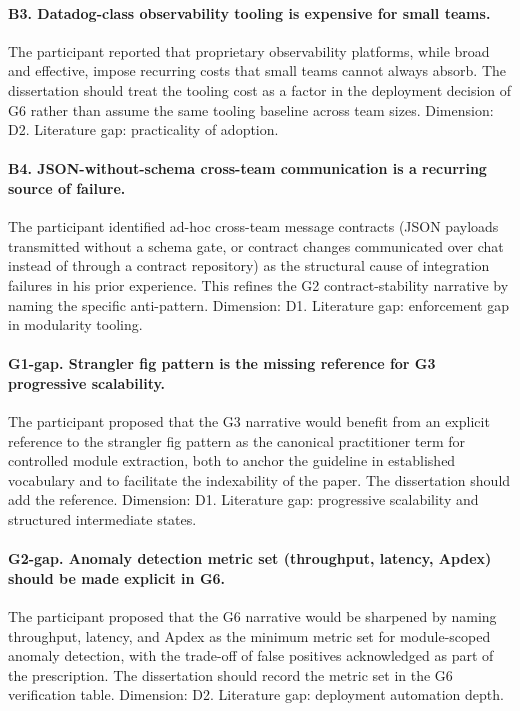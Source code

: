 \paragraph*{B3. Datadog-class observability tooling is expensive for small teams.} The participant reported that proprietary observability platforms, while broad and effective, impose recurring costs that small teams cannot always absorb. The dissertation should treat the tooling cost as a factor in the deployment decision of G6 rather than assume the same tooling baseline across team sizes. Dimension: D2. Literature gap: practicality of adoption.

\paragraph*{B4. JSON-without-schema cross-team communication is a recurring source of failure.} The participant identified ad-hoc cross-team message contracts (JSON payloads transmitted without a schema gate, or contract changes communicated over chat instead of through a contract repository) as the structural cause of integration failures in his prior experience. This refines the G2 contract-stability narrative by naming the specific anti-pattern. Dimension: D1. Literature gap: enforcement gap in modularity tooling.

\paragraph*{G1-gap. Strangler fig pattern is the missing reference for G3 progressive scalability.} The participant proposed that the G3 narrative would benefit from an explicit reference to the strangler fig pattern as the canonical practitioner term for controlled module extraction, both to anchor the guideline in established vocabulary and to facilitate the indexability of the paper. The dissertation should add the reference. Dimension: D1. Literature gap: progressive scalability and structured intermediate states.

\paragraph*{G2-gap. Anomaly detection metric set (throughput, latency, Apdex) should be made explicit in G6.} The participant proposed that the G6 narrative would be sharpened by naming throughput, latency, and Apdex as the minimum metric set for module-scoped anomaly detection, with the trade-off of false positives acknowledged as part of the prescription. The dissertation should record the metric set in the G6 verification table. Dimension: D2. Literature gap: deployment automation depth.

